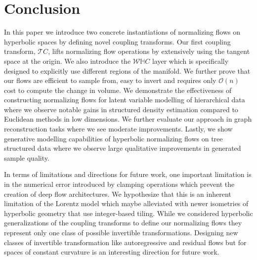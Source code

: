 \section{Conclusion}
In this paper we introduce two concrete instantiations of normalizing flows on hyperbolic spaces by defining novel coupling transforms. Our first coupling transform, $\mathcal{T}C$, lifts normalizing flow operations by extensively using the tangent space at the origin. We also introduce the $\mathcal{W}\mathbb{H}C$ layer which is specifically designed to explicitly use different regions of the manifold. We further prove that our flows are efficient to sample from, easy to invert and requires only $\mathcal{O}(n)$ cost to compute the change in volume. We demonstrate the effectiveness of constructing normalizing flows for latent variable modelling of hierarchical data where we observe notable gains in structured density estimation compared to Euclidean methods in low dimensions. We further evaluate our approach in graph reconstruction tasks where we see moderate improvements. Lastly, we show generative modelling capabilities of hyperbolic normalizing flows on tree structured data where we observe large qualitative improvements in generated sample quality. 

In terms of limitations and directions for future work, one important limitation is in the numerical error introduced by clamping operations which prevent the creation of deep flow architectures. We hypothesize that this is an inherent limitation of the Lorentz model which maybe alleviated with newer isometries of hyperbolic geometry that use integer-based tiling. While we considered hyperbolic generalizations of the coupling transforms to define our normalizing flows they represent only one class of possible invertible transformations. Designing new classes of invertible transformation like autoregressive and residual flows but for spaces of constant curvature is an interesting direction for future work.